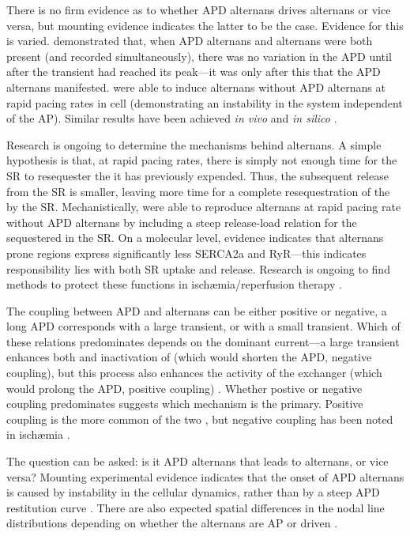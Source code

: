 \documentclass[../thesis-main.tex]{subfiles}
\begin{document}
There is no firm evidence as to whether APD alternans drives \ca{} alternans or vice versa, but mounting evidence indicates the latter to be the case. Evidence for this is varied. \citet{Lee1988} demonstrated that, when APD alternans and \ca{} alternans were both present (and recorded simultaneously), there was no variation in the APD until after the \ca{} transient had reached its peak---it was only after this that the APD alternans manifested. \citet{Chudin1999} were able to induce \ca{} alternans without APD alternans at rapid pacing rates in cell (demonstrating an instability in the \ca{} system independent of the AP). Similar results have been achieved \emph{in vivo} \citep{Aistrup2006} and \emph{in silico} \citep{Sato2006}.

Research is ongoing to determine the mechanisms behind \ca{} alternans. A simple hypothesis is that, at rapid pacing rates, there is simply not enough time for the SR to resequester the \ca{} it has previously expended. Thus, the subsequent \ca{} release from the SR is smaller, leaving more time for a complete resequestration of the \ca{} by the SR. Mechanistically, \citet{Shiferaw2003} were able to reproduce \ca{} alternans at rapid pacing rate without APD alternans by including a steep release-load relation for the \ca{} sequestered in the SR. On a molecular level, evidence indicates that alternans prone regions express significantly less SERCA2a and RyR---this indicates responsibility lies with both SR uptake and release. Research is ongoing to find methods to protect these functions in isch\ae{}mia/reperfusion therapy \citep{Wang2013}.

The coupling between APD and \ca{} alternans can be either positive or negative, \idest{} a long APD corresponds with a large \cai{} transient, or with a small \cai{} transient. Which of these relations predominates depends on the dominant current---a large \cai{} transient enhances both \iks{} and inactivation of \ica{} (which would shorten the APD, \idest{} negative coupling), but this process also enhances the activity of the exchanger \inaca{} (which would prolong the APD, \idest{} positive coupling) \citep{Shiferaw2005}. Whether postive or negative coupling predominates suggests which mechanism is the primary. Positive coupling is the more common of the two \citep{Laurita2008}, but negative coupling has been noted in isch\ae{}mia \citep{Lee1988}.

The question can be asked: is it APD alternans that leads to \ca{} alternans, or vice versa? Mounting experimental evidence indicates that the onset of APD alternans is caused by instability in the cellular \cai{} dynamics, rather than by a steep APD restitution curve \citep{Goldhaber2005, Pruvot2004}. There are also expected spatial differences in the nodal line distributions depending on whether the alternans are AP or \ca{} driven \citep{Weiss2006}.
\end{document}

